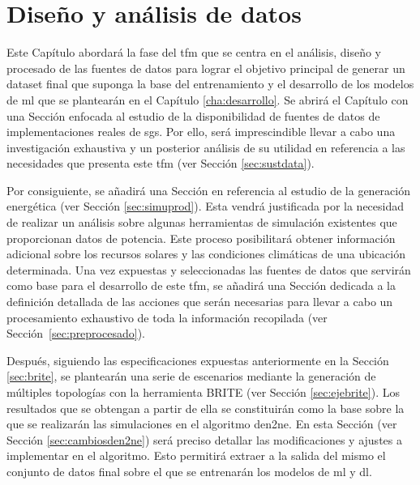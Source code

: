 \chapter{Diseño y análisis de datos}
\label{cha:analisis}

Este Capítulo abordará la fase del \gls{tfm} que se centra en el análisis, diseño y procesado de las fuentes de datos para lograr el objetivo principal de generar un dataset final que suponga la base del entrenamiento y el desarrollo de los modelos de \gls{ml} que se plantearán en el Capítulo \ref{cha:desarrollo}. Se abrirá el Capítulo con una Sección enfocada al estudio de la disponibilidad de fuentes de datos de implementaciones reales de \gls{sg}s. Por ello, será imprescindible llevar a cabo una investigación exhaustiva y un posterior análisis de su utilidad en referencia a las necesidades que presenta este \gls{tfm} (ver Sección \ref{sec:sustdata}).

\vspace{3mm}

Por consiguiente, se añadirá una Sección en referencia al estudio de la generación energética (ver Sección \ref{sec:simuprod}). Esta vendrá justificada por la necesidad de realizar un análisis sobre algunas herramientas de simulación existentes que proporcionan datos de potencia. Este proceso posibilitará obtener información adicional sobre los recursos solares y las condiciones climáticas de una ubicación determinada. Una vez expuestas y seleccionadas las fuentes de datos que servirán como base para el desarrollo de este \gls{tfm}, se añadirá una Sección dedicada a la definición detallada de las acciones que serán necesarias para llevar a cabo un procesamiento exhaustivo de toda la información recopilada (ver Sección~\ref{sec:preprocesado}). 

\vspace{3mm}

Después, siguiendo las especificaciones expuestas anteriormente en la Sección \ref{sec:brite}, se plantearán una serie de escenarios mediante la generación de múltiples topologías con la herramienta BRITE (ver Sección \ref{sec:ejebrite}). Los resultados que se obtengan a partir de ella se constituirán como la base sobre la que se realizarán las simulaciones en el algoritmo \gls{den2ne}. En esta Sección (ver Sección \ref{sec:cambiosden2ne}) será preciso detallar las modificaciones y ajustes a implementar en el algoritmo. Esto permitirá extraer a la salida del mismo el conjunto de datos final sobre el que se entrenarán los modelos de \gls{ml} y \gls{dl}.


